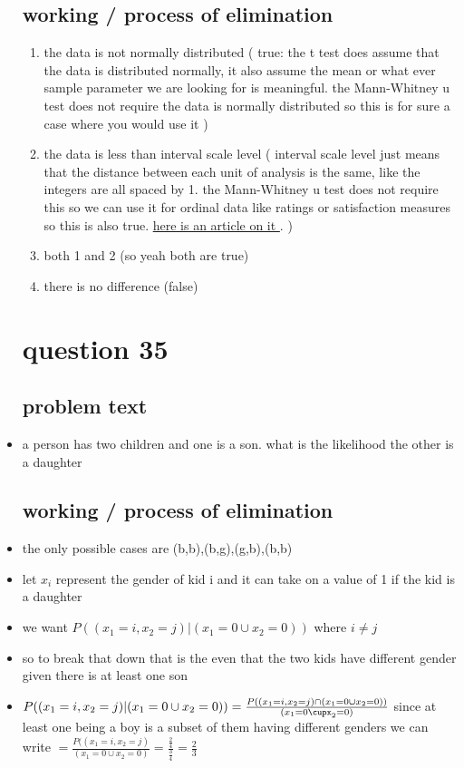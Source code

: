 \documentclass{article}
\begin{document}
\begin{itemize}
\subsection{working / process of elimination }
\begin{enumerate}
    \item the data is not normally distributed ( true: the t test does assume that the data is distributed normally, it also assume the mean or what ever sample parameter we are looking for is meaningful. the  Mann-Whitney u test does not require the data is normally distributed so this is for sure a case where you would use it )  
    \item the data is less than interval scale level ( interval scale level just means that the distance between each unit of analysis is the same, like the integers are all spaced by 1. the Mann-Whitney u test does not require this so we can use it for ordinal data like ratings or satisfaction measures so this is also true. \href{https://www.questionpro.com/blog/nominal-ordinal-interval-ratio/}{here is an article on it }. )
    \item both 1 and 2 (so yeah both are true)
    \item there is no difference (false) 
\end{enumerate}

\section{question 35}
\subsection{problem text}
\item a person has two children and one is a son. what is the likelihood the other is a daughter
\subsection{working / process of elimination }
\item the only possible cases are (b,b),(b,g),(g,b),(b,b)
\item let $x_i$ represent the gender of kid i and it can take on a value of 1 if the kid is a daughter
\item we want $P((x_1=i,x_2=j)|(x_1=0\cup x_2=0))$ where $i\neq j$
\item so to break that down that is the even that the two kids have different gender given there is at least one son 
\item 
$P((x_1=i,x_2=j)|(x_1=0\cup x_2=0))=\frac{P((x_1=i,x_2=j)\cap(x_1=0\cup x_2=0))}{(x_1=0\cupx_2=0)}$ since at least one being a boy is a subset of them having different genders we can write $ =\frac{P((x_1=i,x_2=j)}{(x_1=0\cup x_2=0)}=\frac{\frac{2}{4}}{\frac{3}{4}}=\frac{2}{3}$ 

\end{itemize}
\end{document}
